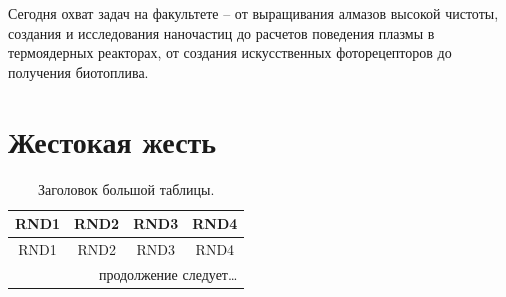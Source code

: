 \documentclass[a4paper,12pt]{article}
\begin{document}
Сегодня охват задач на факультете – от выращивания алмазов высокой чистоты, создания и исследования наночастиц до расчетов поведения плазмы в термоядерных реакторах, от создания искусственных фоторецепторов до получения биотоплива.


\section{Жестокая жесть}

\begin{longtable}{|c|c|c|c|}
	\caption{Заголовок большой таблицы.}\\
	\hline
	\textbf{RND1} & \textbf{RND2} & \textbf{RND3} & \textbf{RND4} \\ \hline
	\endfirsthead
	\hline
	RND1 & RND2 & RND3 & RND4 \\ \hline
	\endhead
	\hline
	\multicolumn{4}{r}{продолжение следует\ldots} \
	\endfoot
	\hline
	\endlastfoot


\end{longtable}
\end{document}
